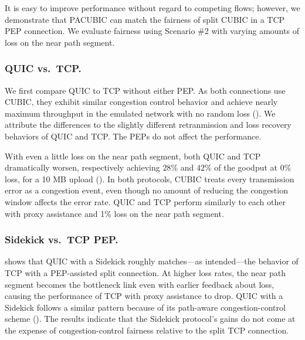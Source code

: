 It is easy to improve performance without regard to competing flows;
however, we demonstrate that PACUBIC can
match the fairness of split CUBIC in a TCP PEP connection\@.
We evaluate fairness using Scenario \#2 with varying amounts of loss on the
near path segment.

\subsubsection{QUIC vs.\ TCP\@.}
We first compare QUIC to TCP without either PEP\@.
As both connections use CUBIC, they exhibit similar
congestion control behavior and achieve nearly maximum throughput in the
emulated network with no random loss ().
We attribute the differences to the slightly different retranmission and
loss recovery behaviors of QUIC and TCP\@. The PEPs do not affect the
performance.

With even a little loss on the near path segment, both QUIC and TCP dramatically
worsen, respectively achieving $28\%$ and $42\%$ of the goodput at $0\%$ loss,
for a 10 MB upload ().
In both protocols, CUBIC treats every transmission error as a congestion event,
even though no amount of reducing the congestion window affects the error rate.
QUIC and TCP perform similarly to each other with proxy assistance and 1\%
loss on the near path segment.

\subsubsection{Sidekick vs.\ TCP PEP\@.}
 shows that QUIC with a Sidekick roughly matches---as
 intended---the behavior of TCP with a PEP-assisted split connection. At higher
loss rates, the near path segment becomes the bottleneck link even with earlier
feedback about loss, causing the performance of TCP with proxy assistance to
drop. QUIC with a Sidekick follows a similar pattern because of its path-aware
congestion-control scheme (). The
results indicate that the Sidekick protocol's gains do not come at the expense
of congestion-control fairness relative to the split TCP connection.
